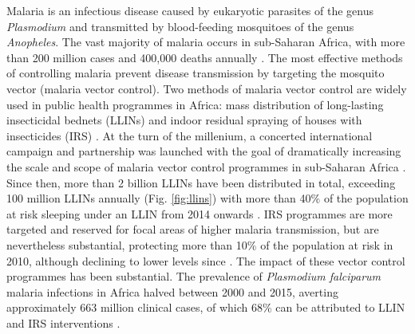 \documentclass[a4paper,11pt,abstracton,hidelinks]{scrartcl}
\begin{document}
Malaria is an infectious disease caused by eukaryotic parasites of the genus \textit{Plasmodium} and transmitted by blood-feeding mosquitoes of the genus \textit{Anopheles}.
%
The vast majority of malaria occurs in sub-Saharan Africa, with more than 200 million cases and 400,000 deaths annually \citep{WHO2019WMR}.
%
The most effective methods of controlling malaria prevent disease transmission by targeting the mosquito vector (malaria vector control).
%
Two methods of malaria vector control are widely used in public health programmes in Africa: mass distribution of long-lasting insecticidal bednets (LLINs)
\citep{Carnevale2019,Okumu2020} and indoor residual spraying of houses with insecticides (IRS) \citep{WHO2006IRS,Pluess2010,Choi2019}.
%
At the turn of the millenium, a concerted international campaign and partnership was launched with the goal of dramatically increasing the scale and scope of malaria vector control programmes in sub-Saharan Africa \citep{Nabarro1998}.
%
Since then, more than 2 billion LLINs have been distributed in total, exceeding 100 million LLINs annually \citep{AMP2020} (Fig. \ref{fig:llins}) with more than 40\% of the population at risk sleeping under an LLIN from 2014 onwards \citep{Bhatt2015,WHO2019WMR}.
%
IRS programmes are more targeted and reserved for focal areas of higher malaria transmission, but are nevertheless substantial, protecting more than 10\% of the population at risk in 2010, although declining to lower levels since \citep{Bhatt2015,WHO2019WMR,Tangena2020}. 
%
The impact of these vector control programmes has been substantial. 
%
The prevalence of \textit{Plasmodium falciparum} malaria infections in Africa halved between 2000 and 2015, averting approximately 663 million clinical cases, of which 68\% can be attributed to LLIN and IRS interventions \citep{Bhatt2015}.
\end{document}

